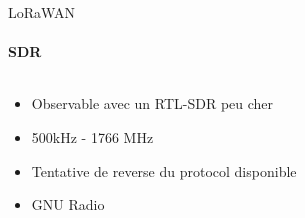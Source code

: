 \begin{frame}{LoRaWAN}
\framesubtitle{SDR}
\begin{columns}
  \begin{column}{0.5\textwidth}
  \begin{itemize}
    \item Observable avec un RTL-SDR peu cher
    \item 500kHz - 1766 MHz
    \item Tentative de reverse du protocol disponible
    \item GNU Radio
  \end{itemize}
  \end{column}
  \begin{column}{0.5\textwidth}
   \begin{center}
  \end{center}
  \end{column}
\end{columns}

\end{frame}


